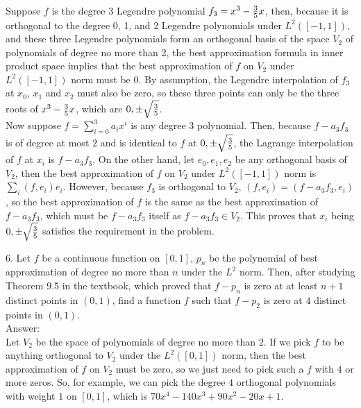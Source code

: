 \documentclass[20pt]{article} %
\theoremstyle{break}
\begin{document}
Suppose $f$ is the degree 3 Legendre polynomial $f_3=x^3-{3\over 5}x$, then, because it is orthogonal to the degree 0, 1, and 2 Legendre polynomials under $L^2([-1, 1])$, and these three Legendre polynomials form an orthogonal basis of the space $V_2$ of polynomials of degree no more than 2, the best approximation formula in inner product space implies that the best approximation of $f$ on $V_2$ under $L^2([-1, 1])$ norm must be $0$. By assumption, the Legendre interpolation of $f_3$ at $x_0$, $x_1$ and $x_2$ must also be zero, so these three points can only be the three roots of $x^3-{3\over 5}x$, which are $0, \pm\sqrt{3\over 5}$.\\

Now suppose $f=\sum_{i=0}^3a_ix^i$ is any degree $3$ polynomial. Then, because $f-a_3f_3$ is of degree at most $2$ and is identical to $f$ at $0, \pm\sqrt{3\over 5}$, the Lagrange interpolation of $f$ at $x_i$ is $f-a_3f_3$. On the other hand, let $e_0, e_1, e_2$ be any orthogonal basis of $V_2$, then the best approximation of $f$ on $V_2$ under $L^2([-1, 1])$ norm is $\sum_i(f, e_i)e_i$. However, because $f_3$ is orthogonal to $V_2$, $(f, e_i)=(f-a_3f_3, e_i)$, so the best approximation of $f$ is the same as the best approximation of $f-a_3f_3$, which must be $f-a_3f_3$ itself as $f-a_3f_3\in V_2$. This proves that $x_i$ being $0, \pm\sqrt{3\over 5}$ satisfies the requirement in the problem.\\

\newpage

6. Let $f$ be a continuous function on $[0, 1]$, $p_n$ be the polynomial of best approximation of degree no more than $n$ under the $L^2$ norm. Then, after studying Theorem 9.5 in the textbook, which proved that $f-p_n$ is zero at at least $n+1$ distinct points in $(0, 1)$, find a function $f$ such that $f-p_2$ is zero at $4$ distinct points in $(0, 1)$.\\

Answer:\\

Let $V_2$ be the space of polynomials of degree no more than $2$. If we pick $f$ to be anything orthogonal to $V_2$ under the $L^2([0, 1])$ norm, then the best approximation of $f$ on $V_2$ must be zero, so we just need to pick such a $f$ with $4$ or more zeros. So, for example, we can pick the degree $4$ orthogonal polynomials with weight $1$ on $[0, 1]$, which is $70x^4-140x^3+90x^2-20x+1$.
\end{document}
